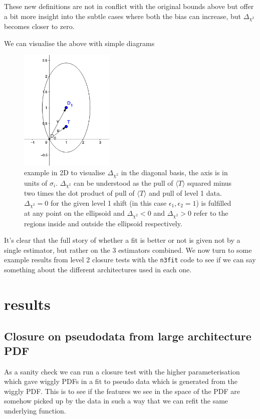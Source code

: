 \documentclass[a4paper]{article}
\newcommand{\nfit}{ \texttt{n3fit} }
\newcommand{\dcs}{ \Delta_{\chi^{2}} }
\newcommand{\thc}{\langle T \rangle}
\begin{document}
These new definitions are not in conflict with the original bounds above but
offer a bit more insight into the subtle cases where both the bias can increase,
but $\dcs$ becomes closer to zero.

We can visualise the above with simple diagrams

\begin{figure}[!h]
    \centering
    \includegraphics[width=0.4\textwidth]{vectorexample2.png}
    \caption{example in 2D to visualise $\dcs$ in the diagonal basis, the axis
    is in units of $\sigma_{i}$. $\dcs$ can be understood as the pull of
    $\thc$ squared minus two times the dot product of pull of $\thc$ and pull of
    level 1 data. $\dcs = 0$ for the given level 1 shift (in this case
    $\epsilon_1, \epsilon_2 = 1$) is fulfilled at any point on the ellipsoid and
    $\dcs<0$ and $\dcs>0$ refer to the regions inside and outside the ellipsoid
    respectively.}
    \label{fig:vectorexample}
\end{figure}

It's clear that the full story of whether a fit is better or not is given not
by a single estimator, but rather on the 3 estimators combined. We now turn to
some example results from level 2 closure tests with the \nfit code to see if we
can say something about the different architectures used in each one.

\section{results}

\subsection{Closure on pseudodata from large architecture PDF}

As a sanity check we can run a closure test with the higher parameterisation
which gave wiggly PDFs in a fit to pseudo data which is generated from the
wiggly PDF. This is to see if the features we see in the space of the PDF are
somehow picked up by the data in such a way that we can refit the same underlying
function.
\end{document}
